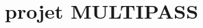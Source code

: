 \renewcommand{\partname}{}
\renewcommand{\chaptername}{}
\renewcommand{\thechapter}{}
\renewcommand{\thesection}{}

\part{projet MULTIPASS}


